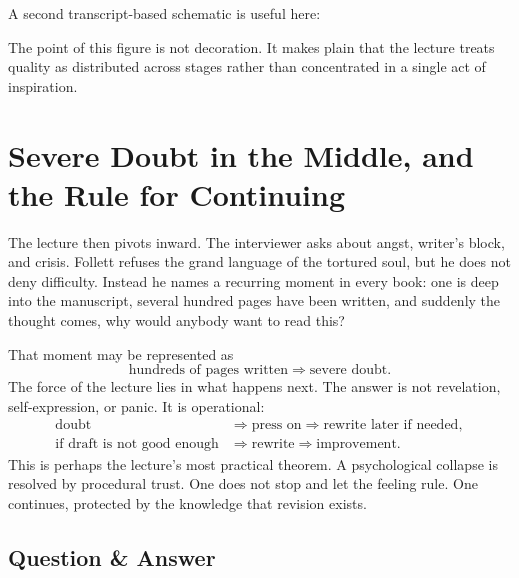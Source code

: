 A second transcript-based schematic is useful here:

\begin{figure}[h]
\centering
{}
\end{figure}

The point of this figure is not decoration. It makes plain that the lecture treats quality as distributed across stages rather than concentrated in a single act of inspiration.

\section{Severe Doubt in the Middle, and the Rule for Continuing}

The lecture then pivots inward. The interviewer asks about angst, writer's block, and crisis. Follett refuses the grand language of the tortured soul, but he does not deny difficulty. Instead he names a recurring moment in every book: one is deep into the manuscript, several hundred pages have been written, and suddenly the thought comes, why would anybody want to read this?

That moment may be represented as
\begin{equation}
\text{hundreds of pages written} \Rightarrow \text{severe doubt}.
\end{equation}
The force of the lecture lies in what happens next. The answer is not revelation, self-expression, or panic. It is operational:
\begin{align}
\text{doubt} &\Rightarrow \text{press on} \Rightarrow \text{rewrite later if needed},\\
\text{if draft is not good enough} &\Rightarrow \text{rewrite} \Rightarrow \text{improvement}.
\end{align}
This is perhaps the lecture's most practical theorem. A psychological collapse is resolved by procedural trust. One does not stop and let the feeling rule. One continues, protected by the knowledge that revision exists.

\subsection{Question \& Answer}

